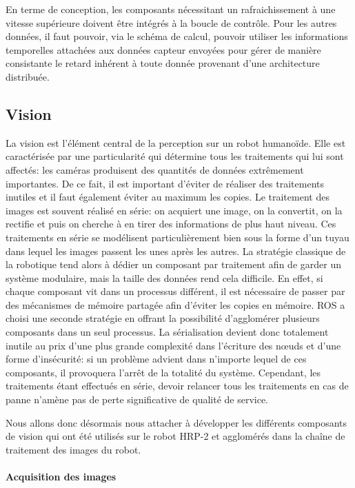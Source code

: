 En terme de conception, les composants nécessitant un rafraichissement
à une vitesse supérieure doivent être intégrés à la boucle de
contrôle. Pour les autres données, il faut pouvoir, via le schéma de
calcul, pouvoir utiliser les informations temporelles attachées aux
données capteur envoyées pour gérer de manière consistante le retard
inhérent à toute donnée provenant d'une architecture distribuée.


\subsection{Vision}


La vision est l'élément central de la perception sur un robot
humanoïde. Elle est caractérisée par une particularité qui détermine
tous les traitements qui lui sont affectés: les caméras produisent des
quantités de données extrêmement importantes. De ce fait, il est
important d'éviter de réaliser des traitements inutiles et il faut
également éviter au maximum les copies. Le traitement des images est
souvent réalisé en série: on acquiert une image, on la convertit, on
la rectifie et puis on cherche à en tirer des informations de plus
haut niveau. Ces traitements en série se modélisent particulièrement
bien sous la forme d'un tuyau dans lequel les images passent les unes
après les autres. La stratégie classique de la robotique tend alors à
dédier un composant par traitement afin de garder un système
modulaire, mais la taille des données rend cela difficile. En effet,
si chaque composant vit dans un processus différent, il est nécessaire
de passer par des mécanismes de mémoire partagée afin d'éviter les
copies en mémoire. ROS a choisi une seconde stratégie en offrant la
possibilité d'agglomérer plusieurs composants dans un seul
processus. La sérialisation devient donc totalement inutile au prix
d'une plus grande complexité dans l'écriture des n\oe uds et d'une
forme d'insécurité: si un problème advient dans n'importe lequel de
ces composants, il provoquera l'arrêt de la totalité du
système. Cependant, les traitements étant effectués en série, devoir
relancer tous les traitements en cas de panne n'amène pas de perte
significative de qualité de service.


Nous allons donc désormais nous attacher à développer les différents
composants de vision qui ont été utilisés sur le robot HRP-2 et
agglomérés dans la chaîne de traitement des images du robot.


\paragraph{Acquisition des images}

